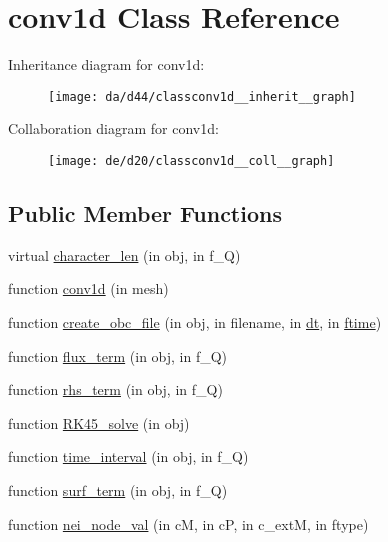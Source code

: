 \hypertarget{classconv1d}{}\section{conv1d Class Reference}
\label{classconv1d}


Inheritance diagram for conv1d\+:
\nopagebreak
\begin{figure}[H]
\begin{center}
\leavevmode
\texttt{[image: da/d44/classconv1d\_\_inherit\_\_graph]}
\end{center}
\end{figure}


Collaboration diagram for conv1d\+:
\nopagebreak
\begin{figure}[H]
\begin{center}
\leavevmode
\texttt{[image: de/d20/classconv1d\_\_coll\_\_graph]}
\end{center}
\end{figure}
\subsection*{Public Member Functions}
\begin{DoxyCompactItemize}
\item 
virtual \hyperlink{classconv1d_a8a2a102c6d68a467cefe7db537a971bc}{character\+\_\+len} (in obj, in f\+\_\+Q)
\item 
function \hyperlink{classconv1d_aaaf10511813f52fdd403c6b1fcd583bd}{conv1d} (in mesh)
\item 
function \hyperlink{classconv1d_aae2f3637e8e9da279b837720c97bf50c}{create\+\_\+obc\+\_\+file} (in obj, in filename, in \hyperlink{classconv1d_adf437888f16fbfd326f087077cf022d5}{dt}, in \hyperlink{classconv1d_a14e36ea9e24c4edb42b697488f646045}{ftime})
\item 
function \hyperlink{classconv1d_a4834e397bd99e34e3971950506360996}{flux\+\_\+term} (in obj, in f\+\_\+Q)
\item 
function \hyperlink{classconv1d_a7e9949e1bd85c6a659bae307338132e3}{rhs\+\_\+term} (in obj, in f\+\_\+Q)
\item 
function \hyperlink{classconv1d_aee855d61a5e3cc2b902d88ab6a9763eb}{R\+K45\+\_\+solve} (in obj)
\item 
function \hyperlink{classconv1d_a04d183892adfd894a63d6d47f9cf7ba5}{time\+\_\+interval} (in obj, in f\+\_\+Q)
\item 
function \hyperlink{classconv1d_a2c40a1bfb84a9966aa630ac62aea345e}{surf\+\_\+term} (in obj, in f\+\_\+Q)
\item 
function \hyperlink{classconv1d_a15e0c0d4ed64875917f0c84559f8c510}{nei\+\_\+node\+\_\+val} (in cM, in cP, in c\+\_\+extM, in ftype)
\end{DoxyCompactItemize}
